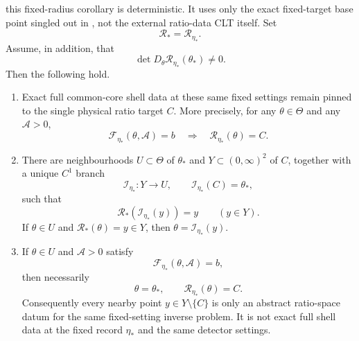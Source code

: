 \begin{corollary}\label{thm:two-mode-main}
\ResponseStandingClause this fixed-radius corollary is deterministic. It uses only
the exact fixed-target base point singled out in
, not the external ratio-data CLT itself. Set
\[
\mathcal R_*=\mathcal R_{\eta_*}.
\]
Assume, in addition, that
\begin{equation}\label{eq:two-mode-ratio-jacobian-main}
\det D_\theta\mathcal R_{\eta_*}(\theta_*)\neq0.
\end{equation}
Then the following hold.
\begin{enumerate}[label=\textup{(\roman*)},leftmargin=2.2em,itemsep=0.25em]
\item Exact full common-core shell data at these same fixed settings remain
pinned to the single physical ratio target $C$. More precisely, for any
$\theta\in\Theta$ and any $\mathcal A>0$,
\[
\mathcal F_{\eta_*}(\theta,\mathcal A)=b
\quad\Longrightarrow\quad
\mathcal R_{\eta_*}(\theta)=C.
\]
\item There are neighbourhoods $U\subset\Theta$ of $\theta_*$ and
$Y\subset(0,\infty)^2$ of $C$, together with a unique $C^1$ branch
\[
\mathcal I_{\eta_*}:Y\to U,\qquad \mathcal I_{\eta_*}(C)=\theta_*,
\]
such that
\[
\mathcal R_*(\mathcal I_{\eta_*}(y))=y\qquad(y\in Y).
\]
If $\theta\in U$ and $\mathcal R_*(\theta)=y\in Y$, then
$\theta=\mathcal I_{\eta_*}(y)$.
\item If $\theta\in U$ and $\mathcal A>0$ satisfy
\[
\mathcal F_{\eta_*}(\theta,\mathcal A)=b,
\]
then necessarily
\[
\theta=\theta_*,
\qquad
\mathcal R_{\eta_*}(\theta)=C.
\]
Consequently every nearby point $y\in Y\setminus\{C\}$ is only an abstract
ratio-space datum for the same fixed-setting inverse problem. It is not exact
full shell data at the fixed record $\eta_*$ and the same detector settings.
\end{enumerate}
\end{corollary}

